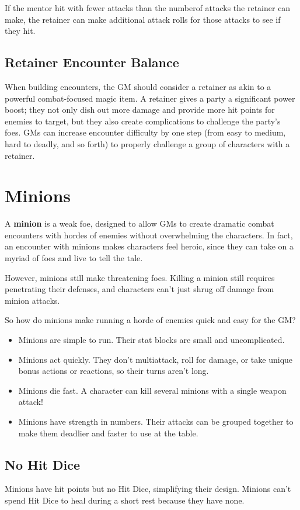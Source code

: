 \documentclass[10pt,a4paper,twoside,bg=print,twocolumn,openany,nodeprecatedcode]{dndbook}
\begin{document}
If the mentor hit with fewer attacks than the numberof attacks the retainer can make, the retainer can make additional attack rolls for those attacks to see if they hit.

\subsection{Retainer Encounter Balance}
When building encounters, the GM should consider a retainer as akin to a powerful combat-focused magic item. A retainer gives a party a significant power boost; they not only dish out more damage and provide more hit points for enemies to target, but they also create complications to challenge the party's foes. GMs can increase encounter difficulty by one step (from easy to medium, hard to deadly, and so forth) to properly challenge a group of characters with a retainer.

\section{Minions}
A \textbf{minion} is a weak foe, designed to allow GMs to create dramatic combat encounters with hordes of enemies without overwhelming the characters. In fact, an encounter with minions makes characters feel heroic, since they can take on a myriad of foes and live to tell the tale.

However, minions still make threatening foes. Killing a minion still requires penetrating their defenses, and characters can't just shrug off damage from minion attacks.

So how do minions make running a horde of enemies quick and easy for the GM?


\begin{itemize}
\item Minions are simple to run. Their stat blocks are small and uncomplicated.
\item Minions act quickly. They don't multiattack, roll for damage, or take unique bonus actions or reactions, so their turns aren't long.
\item Minions die fast. A character can kill several minions with a single weapon attack!
\item Minions have strength in numbers. Their attacks can be grouped together to make them deadlier and faster to use at the table.
\end{itemize}

\subsection{No Hit Dice}
Minions have hit points but no Hit Dice, simplifying their design. Minions can't spend Hit Dice to heal during a short rest because they have none.
\end{document}
